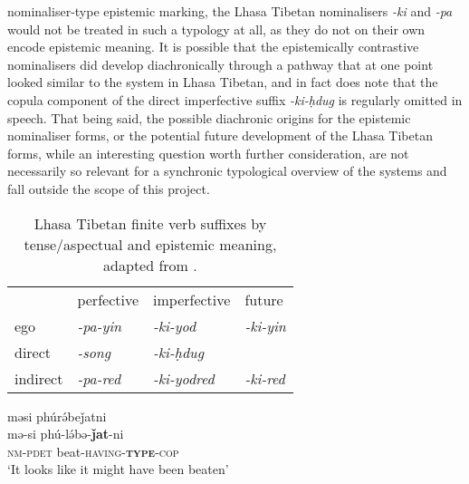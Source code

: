nominaliser-type epistemic marking, the Lhasa Tibetan nominalisers \textit{-ki} and \textit{-pa} would not be treated in such a typology at all, as they do not on their own encode epistemic meaning. It is possible that the epistemically contrastive nominalisers did develop diachronically through a pathway that at one point looked similar to the system in Lhasa Tibetan, and in fact  does note that the copula component of the direct imperfective suffix \textit{-ki-ḥdug} is regularly omitted in speech. That being said, the possible diachronic origins for the epistemic nominaliser forms, or the potential future development of the Lhasa Tibetan forms, while an interesting question worth further consideration, are not necessarily so relevant for a synchronic typological overview of the systems and fall outside the scope of this project. 

\begin{table}
        \begin{tabular}{llll}
         & perfective       & imperfective         & future           \\
        ego                  & \textit{-pa-yin} & \textit{-ki-yod}     & \textit{-ki-yin} \\
        direct               & \textit{-song}   & \textit{-ki-ḥdug}    & \textit{}        \\
        indirect             & \textit{-pa-red} & \textit{-ki-yodred} & \textit{-ki-red}
        \end{tabular}
        \caption{Lhasa Tibetan finite verb suffixes by tense/aspectual and epistemic meaning, adapted from .}\label{t:Description:LhasaTibetanFinite}
\end{table}

\begin{exe}
        \ex\label{e:Description:MeitheiNominaliser}
        \glll məsi phúrə́beǰatni \\
        mə-si phú-lə́bə-\textbf{ǰat}-ni \\
        \textsc{nm-pdet} beat-\textsc{having-\textbf{type}-cop} \\
        \glt `It looks like it might have been beaten' \\
        \cite[Meithei,][296]{Chelliah1997}
\end{exe}

